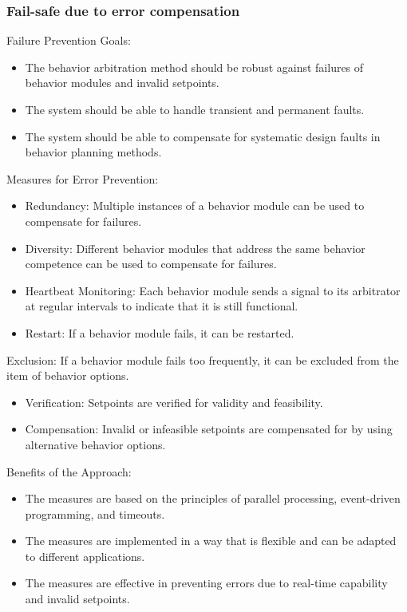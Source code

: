 \subsubsection*{Fail-safe due to error compensation}

    Failure Prevention Goals:
\begin{itemize}
    \item The behavior arbitration method should be robust against failures of behavior modules and invalid setpoints.
    \item The system should be able to handle transient and permanent faults.
    \item The system should be able to compensate for systematic design faults in behavior planning methods.
\end{itemize}
    Measures for Error Prevention:
\begin{itemize}
    \item Redundancy: Multiple instances of a behavior module can be used to compensate for failures.
    \item Diversity: Different behavior modules that address the same behavior competence can be used to compensate for failures.
    \item Heartbeat Monitoring: Each behavior module sends a signal to its arbitrator at regular intervals to indicate that it is still functional.
    \item Restart: If a behavior module fails, it can be restarted.
\end{itemize}
Exclusion: If a behavior module fails too frequently, it can be excluded from the item of behavior options.
\begin{itemize}
    \item Verification: Setpoints are verified for validity and feasibility.
    \item Compensation: Invalid or infeasible setpoints are compensated for by using alternative behavior options.
\end{itemize}
    Benefits of the Approach:
\begin{itemize}
    \item The measures are based on the principles of parallel processing, event-driven programming, and timeouts.
    \item The measures are implemented in a way that is flexible and can be adapted to different applications.
    \item The measures are effective in preventing errors due to real-time capability and invalid setpoints.
\end{itemize}

